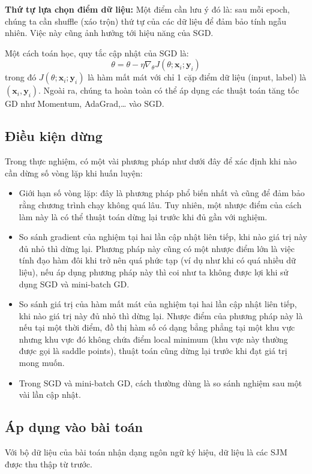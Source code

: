 \textbf{Thứ tự lựa chọn điểm dữ liệu:}
Một điểm cần lưu ý đó là: sau mỗi epoch, chúng ta cần shuffle (xáo trộn) thứ tự của các dữ liệu để đảm bảo tính ngẫu nhiên. Việc này cũng ảnh hưởng tới hiệu năng của SGD.

Một cách toán học, quy tắc cập nhật của SGD là:
$$\theta = \theta - \eta \nabla_{\theta} J(\theta; \mathbf{x}_i; \mathbf{y}_i)$$
trong đó $J(\theta; \mathbf{x}_i; \mathbf{y}_i)$ là hàm mất mát với chỉ 1 cặp điểm dữ liệu (input, label) là $(\mathbf{x}_i, \mathbf{y}_i)$. Ngoài ra, chúng ta hoàn toàn có thể áp dụng các thuật toán tăng tốc GD như Momentum, AdaGrad,… vào SGD.

\subsection{Điều kiện dừng}
Trong thực nghiệm, có một vài phương pháp như dưới đây để xác định khi nào cần dừng số vòng lặp khi huấn luyện:
\begin{itemize}
\item Giới hạn số vòng lặp: đây là phương pháp phổ biến nhất và cũng để đảm bảo rằng chương trình chạy không quá lâu. Tuy nhiên, một nhược điểm của cách làm này là có thể thuật toán dừng lại trước khi đủ gần với nghiệm.
\item So sánh gradient của nghiệm tại hai lần cập nhật liên tiếp, khi nào giá trị này đủ nhỏ thì dừng lại. Phương pháp này cũng có một nhược điểm lớn là việc tính đạo hàm đôi khi trở nên quá phức tạp (ví dụ như khi có quá nhiều dữ liệu), nếu áp dụng phương pháp này thì coi như ta không được lợi khi sử dụng SGD và mini-batch GD.
\item So sánh giá trị của hàm mất mát của nghiệm tại hai lần cập nhật liên tiếp, khi nào giá trị này đủ nhỏ thì dừng lại. Nhược điểm của phương pháp này là nếu tại một thời điểm, đồ thị hàm số có dạng bẳng phẳng tại một khu vực nhưng khu vực đó không chứa điểm local minimum (khu vực này thường được gọi là saddle points), thuật toán cũng dừng lại trước khi đạt giá trị mong muốn.
\item Trong SGD và mini-batch GD, cách thường dùng là so sánh nghiệm sau một vài lần cập nhật.
\end{itemize}


\subsection{Áp dụng vào bài toán}
Với bộ dữ liệu của bài toán nhận dạng ngôn ngữ ký hiệu, dữ liệu là các SJM được thu thập từ trước.

